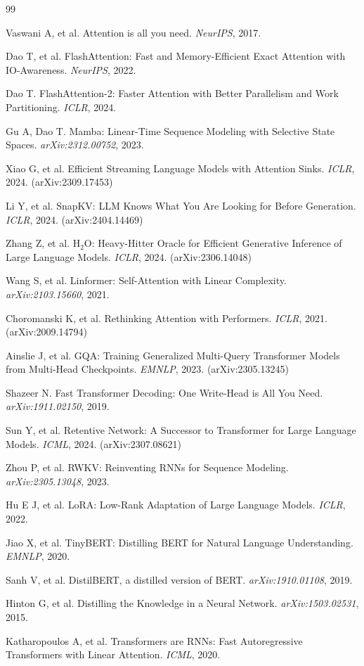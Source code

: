 \documentclass{article}
\begin{document}
\begin{thebibliography}{99}

Vaswani A, et al. Attention is all you need. \textit{NeurIPS}, 2017.

Dao T, et al. FlashAttention: Fast and Memory-Efficient Exact Attention with IO-Awareness. \textit{NeurIPS}, 2022.

Dao T. FlashAttention-2: Faster Attention with Better Parallelism and Work Partitioning. \textit{ICLR}, 2024.

Gu A, Dao T. Mamba: Linear-Time Sequence Modeling with Selective State Spaces. \textit{arXiv:2312.00752}, 2023.

Xiao G, et al. Efficient Streaming Language Models with Attention Sinks. \textit{ICLR}, 2024. (arXiv:2309.17453)

Li Y, et al. SnapKV: LLM Knows What You Are Looking for Before Generation. \textit{ICLR}, 2024. (arXiv:2404.14469)

Zhang Z, et al. H$_2$O: Heavy-Hitter Oracle for Efficient Generative Inference of Large Language Models. \textit{ICLR}, 2024. (arXiv:2306.14048)

Wang S, et al. Linformer: Self-Attention with Linear Complexity. \textit{arXiv:2103.15660}, 2021.

Choromanski K, et al. Rethinking Attention with Performers. \textit{ICLR}, 2021. (arXiv:2009.14794)

Ainslie J, et al. GQA: Training Generalized Multi-Query Transformer Models from Multi-Head Checkpoints. \textit{EMNLP}, 2023. (arXiv:2305.13245)

Shazeer N. Fast Transformer Decoding: One Write-Head is All You Need. \textit{arXiv:1911.02150}, 2019.

Sun Y, et al. Retentive Network: A Successor to Transformer for Large Language Models. \textit{ICML}, 2024. (arXiv:2307.08621)

Zhou P, et al. RWKV: Reinventing RNNs for Sequence Modeling. \textit{arXiv:2305.13048}, 2023.

Hu E J, et al. LoRA: Low-Rank Adaptation of Large Language Models. \textit{ICLR}, 2022.

Jiao X, et al. TinyBERT: Distilling BERT for Natural Language Understanding. \textit{EMNLP}, 2020.

Sanh V, et al. DistilBERT, a distilled version of BERT. \textit{arXiv:1910.01108}, 2019.

Hinton G, et al. Distilling the Knowledge in a Neural Network. \textit{arXiv:1503.02531}, 2015.

Katharopoulos A, et al. Transformers are RNNs: Fast Autoregressive Transformers with Linear Attention. \textit{ICML}, 2020.

\end{thebibliography}
\end{document}
